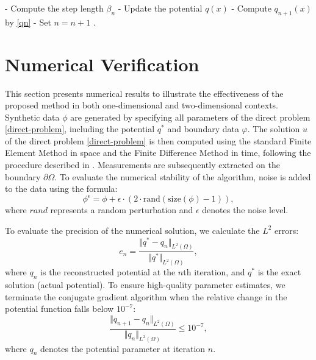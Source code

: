 \documentclass[a4paper,12pt,reqno,natbib]{amsart}
\begin{document}
{\begin{algorithm}[H]
{- Compute the step length $\beta_n$\;
- Update the potential $q(x)$ \;
- Compute $q_{n+1}(x)$ by \eqref{qn}\; 
- Set $n=n+1$\;
}
.
\end{algorithm}



\section{Numerical Verification}\label{sec:numerical-result}

This section presents numerical results to illustrate the effectiveness of the proposed method in both one-dimensional and two-dimensional contexts. Synthetic data $\phi$ are generated by specifying all parameters of the direct problem \eqref{direct-problem}, including the potential $q^*$ and boundary data $\varphi$. The solution $u$ of the direct problem \eqref{direct-problem} is then computed using the standard Finite Element Method in space and the Finite Difference Method in time, following the procedure described in \cite{DiegoMurio2008}. Measurements are subsequently extracted on the boundary $\partial\Omega$. To evaluate the numerical stability of the algorithm, noise is added to the data using the formula:
\begin{equation*}%
    \phi^{\epsilon}=\phi+\epsilon \cdot (2 \cdot \text{rand}(\text{size}(\phi)-1)),
\end{equation*}
where $rand$ represents a random perturbation and $\epsilon$ denotes the noise level.


To evaluate the precision of the numerical solution, we calculate the $L^2$ errors:
\begin{equation}\label{e-nn}
 e_{n}=\frac{\Vert q^* -q_{n}\Vert_{L^2(\Omega)}}{\Vert q^* \Vert_{L^2(\Omega)}},   
\end{equation}
where $q_{n}$ is the reconstructed potential at the $n$th iteration, and $q^*$ is the exact solution (actual potential). To ensure high-quality parameter estimates, we terminate the conjugate gradient algorithm when the relative change in the potential function falls below $10^{-7}$:
\[
\frac{\Vert q_{n+1}-q_{n}\Vert_{L^2(\Omega)}}{\Vert q_{n}\Vert_{L^2(\Omega)}} \leq 10^{-7},
\]
where $q_{n}$ denotes the potential parameter at iteration $n$.

}
\end{document}
